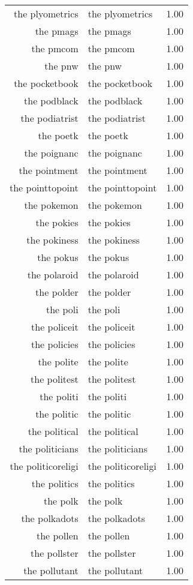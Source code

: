 \begin{table}[ht]
\begin{tabular}{rlr}
  the plyometrics & the plyometrics & 1.00 \\ 
  the pmags & the pmags & 1.00 \\ 
  the pmcom & the pmcom & 1.00 \\ 
  the pnw & the pnw & 1.00 \\ 
  the pocketbook & the pocketbook & 1.00 \\ 
  the podblack & the podblack & 1.00 \\ 
  the podiatrist & the podiatrist & 1.00 \\ 
  the poetk & the poetk & 1.00 \\ 
  the poignanc & the poignanc & 1.00 \\ 
  the pointment & the pointment & 1.00 \\ 
  the pointtopoint & the pointtopoint & 1.00 \\ 
  the pokemon & the pokemon & 1.00 \\ 
  the pokies & the pokies & 1.00 \\ 
  the pokiness & the pokiness & 1.00 \\ 
  the pokus & the pokus & 1.00 \\ 
  the polaroid & the polaroid & 1.00 \\ 
  the polder & the polder & 1.00 \\ 
  the poli & the poli & 1.00 \\ 
  the policeit & the policeit & 1.00 \\ 
  the policies & the policies & 1.00 \\ 
  the polite & the polite & 1.00 \\ 
  the politest & the politest & 1.00 \\ 
  the politi & the politi & 1.00 \\ 
  the politic & the politic & 1.00 \\ 
  the political & the political & 1.00 \\ 
  the politicians & the politicians & 1.00 \\ 
  the politicoreligi & the politicoreligi & 1.00 \\ 
  the politics & the politics & 1.00 \\ 
  the polk & the polk & 1.00 \\ 
  the polkadots & the polkadots & 1.00 \\ 
  the pollen & the pollen & 1.00 \\ 
  the pollster & the pollster & 1.00 \\ 
  the pollutant & the pollutant & 1.00 \\ 

\end{tabular}
\end{table}
